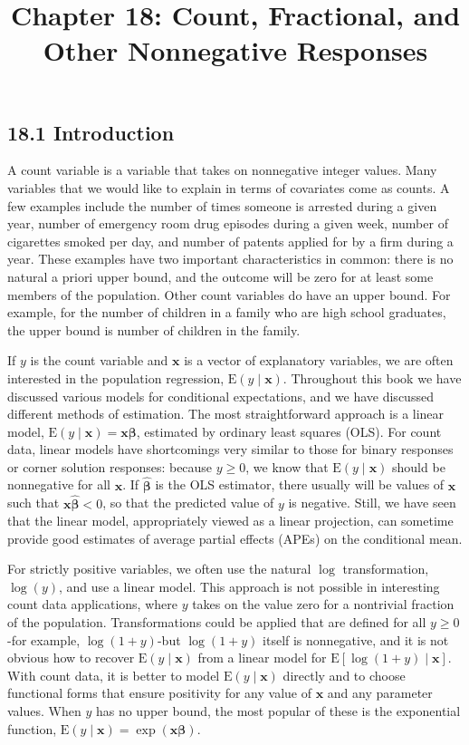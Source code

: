 \documentclass[10pt]{article}
\title{Chapter 18: Count, Fractional, and Other Nonnegative Responses}
\author{}
\date{}
\begin{document}
\maketitle

\subsection*{18.1 Introduction}
A count variable is a variable that takes on nonnegative integer values. Many variables that we would like to explain in terms of covariates come as counts. A few examples include the number of times someone is arrested during a given year, number of emergency room drug episodes during a given week, number of cigarettes smoked per day, and number of patents applied for by a firm during a year. These examples have two important characteristics in common: there is no natural a priori upper bound, and the outcome will be zero for at least some members of the population. Other count variables do have an upper bound. For example, for the number of children in a family who are high school graduates, the upper bound is number of children in the family.

If $y$ is the count variable and $\mathbf{x}$ is a vector of explanatory variables, we are often interested in the population regression, $\mathrm{E}(y \mid \mathbf{x})$. Throughout this book we have discussed various models for conditional expectations, and we have discussed different methods of estimation. The most straightforward approach is a linear model, $\mathrm{E}(y \mid \mathbf{x})=\mathbf{x} \boldsymbol{\beta}$, estimated by ordinary least squares (OLS). For count data, linear models have shortcomings very similar to those for binary responses or corner solution responses: because $y \geq 0$, we know that $\mathrm{E}(y \mid \mathbf{x})$ should be nonnegative for all $\mathbf{x}$. If $\hat{\boldsymbol{\beta}}$ is the OLS estimator, there usually will be values of $\mathbf{x}$ such that $\mathbf{x} \hat{\boldsymbol{\beta}}<0$, so that the predicted value of $y$ is negative. Still, we have seen that the linear model, appropriately viewed as a linear projection, can sometime provide good estimates of average partial effects (APEs) on the conditional mean.

For strictly positive variables, we often use the natural $\log$ transformation, $\log (y)$, and use a linear model. This approach is not possible in interesting count data applications, where $y$ takes on the value zero for a nontrivial fraction of the population. Transformations could be applied that are defined for all $y \geq 0$-for example, $\log (1+y)$-but $\log (1+y)$ itself is nonnegative, and it is not obvious how to recover $\mathrm{E}(y \mid \mathbf{x})$ from a linear model for $\mathrm{E}[\log (1+y) \mid \mathbf{x}]$. With count data, it is better to model $\mathrm{E}(y \mid \mathbf{x})$ directly and to choose functional forms that ensure positivity for any value of $\mathbf{x}$ and any parameter values. When $y$ has no upper bound, the most popular of these is the exponential function, $\mathrm{E}(y \mid \mathbf{x})=\exp (\mathbf{x} \boldsymbol{\beta})$.
\end{document}
